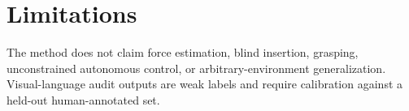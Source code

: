 \section{Limitations}
\label{sec:limitations}

The method does not claim force estimation, blind insertion, grasping,
unconstrained autonomous control, or arbitrary-environment generalization.
Visual-language audit outputs are weak labels and require calibration against a
held-out human-annotated set.
